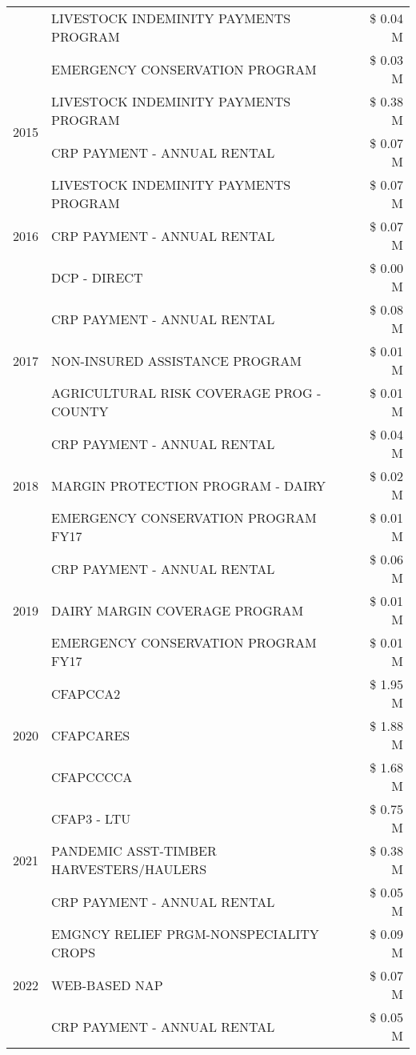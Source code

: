 \begin{tabular}{llr}
 & LIVESTOCK INDEMINITY PAYMENTS PROGRAM & \$ 0.04 M \\
 & EMERGENCY CONSERVATION PROGRAM & \$ 0.03 M \\
\cline{1-3}
\multirow[t]{2}{*}{2015} & LIVESTOCK INDEMINITY PAYMENTS PROGRAM & \$ 0.38 M \\
 & CRP PAYMENT - ANNUAL RENTAL & \$ 0.07 M \\
\cline{1-3}
\multirow[t]{3}{*}{2016} & LIVESTOCK INDEMINITY PAYMENTS PROGRAM & \$ 0.07 M \\
 & CRP PAYMENT - ANNUAL RENTAL & \$ 0.07 M \\
 & DCP - DIRECT & \$ 0.00 M \\
\cline{1-3}
\multirow[t]{3}{*}{2017} & CRP PAYMENT - ANNUAL RENTAL & \$ 0.08 M \\
 & NON-INSURED ASSISTANCE PROGRAM & \$ 0.01 M \\
 & AGRICULTURAL RISK COVERAGE PROG - COUNTY & \$ 0.01 M \\
\cline{1-3}
\multirow[t]{3}{*}{2018} & CRP PAYMENT - ANNUAL RENTAL & \$ 0.04 M \\
 & MARGIN PROTECTION PROGRAM - DAIRY & \$ 0.02 M \\
 & EMERGENCY CONSERVATION PROGRAM FY17 & \$ 0.01 M \\
\cline{1-3}
\multirow[t]{3}{*}{2019} & CRP PAYMENT - ANNUAL RENTAL & \$ 0.06 M \\
 & DAIRY MARGIN COVERAGE PROGRAM & \$ 0.01 M \\
 & EMERGENCY CONSERVATION PROGRAM FY17 & \$ 0.01 M \\
\cline{1-3}
\multirow[t]{3}{*}{2020} & CFAPCCA2 & \$ 1.95 M \\
 & CFAPCARES & \$ 1.88 M \\
 & CFAPCCCCA & \$ 1.68 M \\
\cline{1-3}
\multirow[t]{3}{*}{2021} & CFAP3 - LTU & \$ 0.75 M \\
 & PANDEMIC ASST-TIMBER HARVESTERS/HAULERS & \$ 0.38 M \\
 & CRP PAYMENT - ANNUAL RENTAL & \$ 0.05 M \\
\cline{1-3}
\multirow[t]{3}{*}{2022} & EMGNCY RELIEF PRGM-NONSPECIALITY CROPS & \$ 0.09 M \\
 & WEB-BASED NAP & \$ 0.07 M \\
 & CRP PAYMENT - ANNUAL RENTAL & \$ 0.05 M \\
\cline{1-3}
\bottomrule
\end{tabular}
